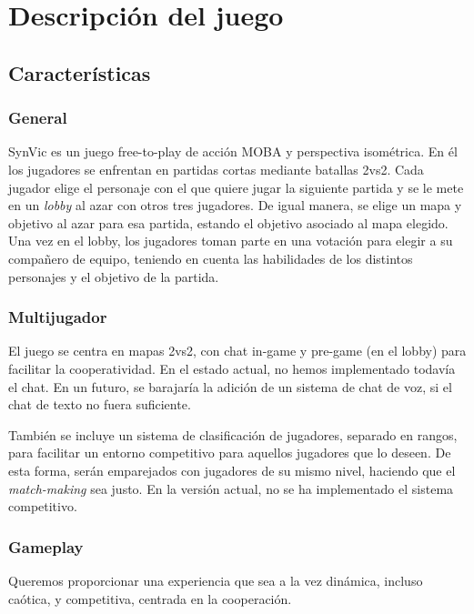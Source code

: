 \chapter{Descripción del juego}


\section{Características}
\subsection{General}
SynVic es un juego free-to-play de acción MOBA y perspectiva isométrica. En él los jugadores se enfrentan en partidas cortas mediante batallas 2vs2. Cada jugador elige el personaje con el que quiere jugar la siguiente partida y se le mete en un \emph{lobby} al azar con otros tres jugadores. De igual manera, se elige un mapa y objetivo al azar para esa partida, estando el objetivo asociado al mapa elegido. Una vez en el lobby, los jugadores toman parte en una votación para elegir a su compañero de equipo, teniendo en cuenta las habilidades de los distintos personajes y el objetivo de la partida.

\subsection{Multijugador}
El juego se centra en mapas 2vs2, con chat in-game y pre-game (en el lobby) para facilitar la cooperatividad. En el estado actual, no hemos implementado todavía el chat. En un futuro, se barajaría la adición de un sistema de chat de voz, si el chat de texto no fuera suficiente.

\vspace{\baselineskip}

También se incluye un sistema de clasificación de jugadores, separado en rangos, para facilitar un entorno competitivo para aquellos jugadores que lo deseen. De esta forma, serán emparejados con jugadores de su mismo nivel, haciendo que el \emph{match-making} sea justo. En la versión actual, no se ha implementado el sistema competitivo.

\subsection{Gameplay}
Queremos proporcionar una experiencia que sea a la vez dinámica, incluso caótica, y competitiva, centrada en la cooperación.

